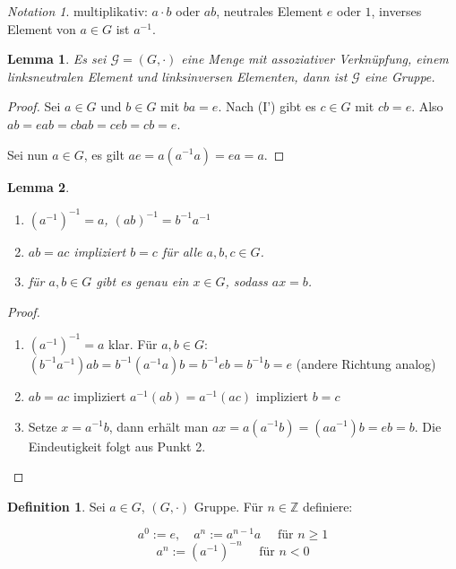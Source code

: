\documentclass[12pt]{scrartcl}%
\newtheorem{lemma}{Lemma}
\theoremstyle{definition}
\newtheorem*{defn}{Definition}
\theoremstyle{remark}
\newtheorem*{notation}{Notation}
\newcommand{\inv}[1]{\left(#1\right)^{-1}}
\newcommand{\Inv}[1]{#1^{-1}}
\begin{document}
\begin{notation}
    multiplikativ: $a\cdot b$ oder $ab$, neutrales Element $e$ oder $1$, inverses Element von $a\in G$ ist $\Inv a$.
\end{notation}

\begin{lemma}
    Es sei $\mathcal{G}=(G,\cdot)$ eine Menge mit assoziativer Verknüpfung, einem linksneutralen Element und linksinversen Elementen, dann ist $\mathcal{G}$ eine Gruppe.
\end{lemma}

\begin{proof}
    Sei $a\in G$ und $b\in G$ mit $ba=e$. Nach (I') gibt es $c\in G$ mit $cb=e$. Also $ab=eab=cbab=ceb=cb=e$.

    Sei nun $a\in G$, es gilt $ae=a(\Inv aa)=ea=a$.
\end{proof}

\begin{lemma}
    \begin{enumerate}
        \item $\inv{\Inv{a}}=a$, $\inv{ab}=\Inv b\Inv a$
        \item $ab=ac$ impliziert $b=c$ für alle $a,b,c\in G$.
        \item für $a,b\in G$ gibt es genau ein $x\in G$, sodass $ax=b$.
    \end{enumerate}
\end{lemma}

\begin{proof}
    \begin{enumerate}
        \item $\inv{\Inv a}=a$ klar. Für $a,b\in G$: $(\Inv b\Inv a)ab=\Inv b(\Inv aa)b=\Inv beb=\Inv bb=e$ (andere Richtung analog) %
        \item $ab=ac$ impliziert $\Inv a(ab)=\Inv a(ac)$ impliziert $b=c$
        \item Setze $x=\Inv ab$, dann erhält man $ax=a(\Inv ab)=(a\Inv a)b=eb=b$.
       	Die Eindeutigkeit folgt aus Punkt 2. \qedhere
    \end{enumerate}
\end{proof}

\begin{defn}
    Sei $a\in G$, $(G,\cdot)$ Gruppe. Für $n\in \mathbb{Z}$ definiere:
    
    $$a^0:=e, \quad a^n:=a^{n-1}a \quad \text{ für } n\geq 1$$
    $$a^n:=\left(\Inv a\right)^{-n} \quad \text{ für } n < 0$$
\end{defn}
\end{document}
